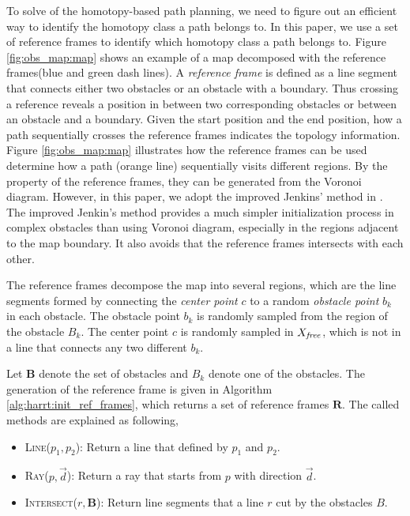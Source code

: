 \documentclass[letterpaper, 10 pt, conference]{ieeeconf}
\begin{document}
To solve of the homotopy-based path planning, we need to figure out an efficient way to identify the homotopy class a path belongs to.
In this paper, we use a set of reference frames to identify which homotopy class a path belongs to.
Figure \ref{fig:obs_map:map} shows an example of a map decomposed with the reference frames(blue and green dash lines).
A \emph{reference frame} is defined as a line segment that connects either two obstacles or  an obstacle with a boundary. Thus crossing a reference reveals a position in between two corresponding obstacles or between an obstacle and a boundary.
Given the start position and the end position, how a path sequentially crosses the reference frames indicates the topology information.
Figure \ref{fig:obs_map:map} illustrates how the reference frames can be used determine how a path (orange line) sequentially visits different regions.
By the property of the reference frames, they can be generated from the Voronoi diagram.
However, in this paper, we adopt the improved Jenkins' method in \cite{Hernandez201544}.
The improved Jenkin's method provides a much simpler initialization process in complex obstacles than using Voronoi diagram, especially in the regions adjacent to the map boundary.
It also avoids that the reference frames intersects with each other.

The reference frames decompose the map into several regions, which are the line segments formed by connecting the \emph{center point} $ c $ to a random \emph{obstacle point} $ b_{k} $ in each obstacle.
The obstacle point $ b_{k} $ is randomly sampled from the region of the obstacle $ B_{k} $.
The center point $ c $ is randomly sampled in $ X_{\it free} $, which is not in a line that connects any two different $ b_{k} $.


Let $ \bm{B} $ denote the set of obstacles and $ B_{k} $ denote one of the obstacles.  
The generation of the reference frame is given in Algorithm \ref{alg:harrt:init_ref_frames}, which returns a set of reference frames $ \bm{R} $.
The called methods are explained as following,
\begin{itemize}
	\item \textsc{Line}($ p_{1}, p_{2} $):
	Return a line that defined by $ p_{1} $ and $ p_{2} $.
	\item \textsc{Ray}($ p, \vec{d} $):
	Return a ray that starts from $ p $ with direction $ \vec{d}  $.
	\item \textsc{Intersect}($ r , \bm{B} $):
	Return line segments that a line $ r $ cut by the obstacles $ B $.
\end{itemize}
\end{document}
